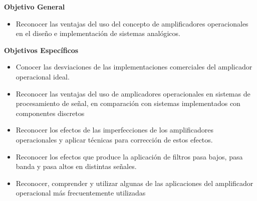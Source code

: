 \textbf{Objetivo General}

\begin{itemize}
    \item Reconocer las ventajas del uso del concepto de amplificadores operacionales en el diseño e implementación de sistemas analógicos.
\end{itemize}

\textbf{Objetivos Específicos}

\begin{itemize}
    \item Conocer las desviaciones de las implementaciones comerciales del amplicador operacional ideal.
    \item Reconocer las ventajas del uso de amplicadores operacionales en sistemas de procesamiento de señal, en comparación con sistemas implementados con componentes discretos 
    \item Reconocer los efectos de las imperfecciones de los amplificadores operacionales y aplicar técnicas para corrección de estos efectos.
    \item Reconocer los efectos que produce la aplicación de filtros pasa bajos, pasa banda y pasa altos en distintas señales.
    \item Reconocer, comprender y utilizar algunas de las aplicaciones del amplificador operacional más frecuentemente utilizadas
\end{itemize}
